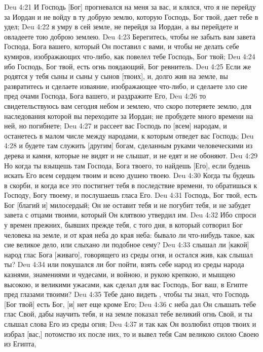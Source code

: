 \vs Deu 4:21 И Господь [Бог] прогневался на меня за вас, и клялся, что я не перейду за Иордан и не войду в ту добрую землю, которую Господь, Бог твой, дает тебе в удел;
\vs Deu 4:22 я умру в сей земле, не перейдя за Иордан, а вы перейдете и овладеете тою доброю землею.
\vs Deu 4:23 Берегитесь, чтобы не забыть вам завета Господа, Бога вашего, который Он поставил с вами, и чтобы не делать себе кумиров, изображающих что-либо, как повелел тебе Господь, Бог твой;
\vs Deu 4:24 ибо Господь, Бог твой, есть огнь поядающий, Бог ревнитель.
\vs Deu 4:25 Если же родятся у тебя сыны и сыны у сынов [твоих], и, долго жив на земле, вы развратитесь и сделаете изваяние, изображающее что-либо, и сделаете зло сие пред очами Господа, Бога вашего, и раздражите Его,
\vs Deu 4:26 то свидетельствуюсь вам сегодня небом и землею, что скоро потеряете землю, для наследования которой вы переходите за Иордан; не пробудете много времени на ней, но погибнете;
\vs Deu 4:27 и рассеет вас Господь по [всем] народам, и останетесь в малом числе между народами, к которым отведет вас Господь;
\vs Deu 4:28 и будете там служить [другим] богам, сделанным руками человеческими из дерева и камня, которые не видят и не слышат, и не едят и не обоняют.
\vs Deu 4:29 Но когда ты взыщешь там Господа, Бога твоего, то найдешь [Его], если будешь искать Его всем сердцем твоим и всею душею твоею.
\vs Deu 4:30 Когда ты будешь в скорби, и когда все это постигнет тебя в последствие времени, то обратишься к Господу, Богу твоему, и послушаешь гласа Его.
\vs Deu 4:31 Господь, Бог твой, есть Бог [благий и] милосердый; Он не оставит тебя и не погубит тебя, и не забудет завета с отцами твоими, который Он клятвою утвердил им.
\vs Deu 4:32 Ибо спроси у времен прежних, бывших прежде тебя, с того дня, в который сотворил Бог человека на земле, и от края неба до края неба: бывало ли что-нибудь такое, как сие великое дело, или слыхано ли подобное сему?
\vs Deu 4:33 слышал ли [какой] народ глас Бога [живаго], говорящего из среды огня, и остался жив, как слышал ты?
\vs Deu 4:34 или покушался ли  бог пойти, взять себе народ из среды  народа казнями, знамениями и чудесами, и войною, и рукою крепкою, и мышцею высокою, и великими ужасами, как сделал для вас Господь, Бог ваш, в Египте пред глазами твоими?
\vs Deu 4:35 Тебе дано видеть , чтобы ты знал, что  Господь [Бог твой] есть Бог, [и] нет еще кроме Его;
\vs Deu 4:36 с неба дал Он слышать тебе глас Свой, дабы научить тебя, и на земле показал тебе великий огнь Свой, и ты слышал слова Его из среды огня;
\vs Deu 4:37 и так как Он возлюбил отцов твоих и избрал [вас,] потомство их после них, то и вывел тебя Сам великою силою Своею из Египта,
